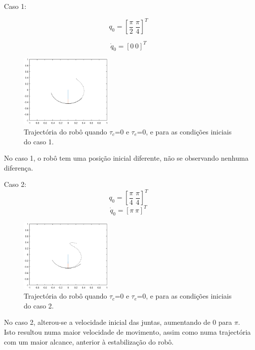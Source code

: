 \documentclass[a4paper,twocolumn,final,11pt]{article}
\begin{document}
Caso 1:

\begin{equation}
    q_0=\left[\frac{\pi}{2}~\frac{\pi}{4}\right]^T
\end{equation}

\begin{equation}
    \dot{q}_0=\left[0~0\right]^T
\end{equation}

\begin{figure}[H]
	\centering
	\includegraphics[width=0.4\textwidth]{4_q_pi4_pi4.eps}
	\caption{Trajectória do robô quando $\tau_c$=0 e $\tau_e$=0, e para as condições iniciais do caso 1.}
  \label{fig4}
\end{figure}

No caso 1, o robô tem uma posição inicial diferente, não se observando nenhuma diferença. 
\linebreak

Caso 2:
\begin{equation}
    q_0=\left[\frac{\pi}{4}~\frac{\pi}{4}\right]^T
\end{equation}
\begin{equation}
    \dot{q}_0=\left[\pi~\pi\right]^T
\end{equation}
\begin{figure}[H]
	\centering
	\includegraphics[width=0.4\textwidth]{4_dq_pi_pi.eps}
	\caption{Trajectória do robô quando $\tau_c$=0 e $\tau_e$=0, e para as condições iniciais do caso 2.}
  \label{fig5}
\end{figure}
No caso 2, alterou-se a velocidade inicial das juntas, aumentando de 0 para $\pi$. Isto resultou numa maior velocidade de movimento, assim como numa trajectória com um maior alcance, anterior à estabilização do robô.
\\
\end{document}
